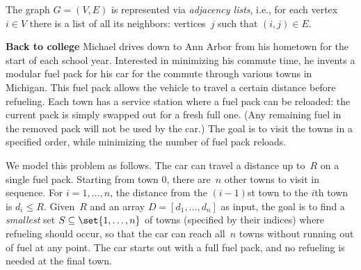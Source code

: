 \documentclass[11pt,addpoints]{exam}
\begin{document}
\begin{questions}
  The graph $G=(V,E)$ is represented via \emph{adjacency lists}, i.e., for each vertex $i \in V$ there is a list of all its neighbors: vertices~$j$ such that $(i,j) \in E$.


  \question \textbf{Back to college} 
  \nopagebreak
   Michael drives down to Ann Arbor from his hometown for the start of each school year.
   Interested in minimizing his commute time, he invents a modular fuel pack for his car for the commute through various towns in Michigan.
   This fuel pack allows the vehicle to travel a certain distance before refueling.
   Each town has a service station where a fuel pack can be reloaded: the current pack is simply swapped out for a fresh full one.
   (Any remaining fuel in the removed pack will not be used by the car.)
   The goal is to visit the towns in a specified order, while minimizing the number of fuel pack reloads.

   We model this problem as follows.
   The car can travel a distance up to~$R$ on a single fuel pack.
   Starting from town 0, there are~$n$ other towns to visit in sequence.
   For $i=1, \ldots, n$, the distance from the $(i-1)$st town to the $i$th town is $d_i \leq R$.
   Given~$R$ and an array $D = [d_1, \ldots, d_n]$ as input, the goal is to find a \emph{smallest} set $S \subseteq \set{1,\ldots,n}$ of towns (specified by their indices) where refueling should occur, so that the car can reach all~$n$ towns without running out of fuel at any point.
   The car starts out with a full fuel pack, and no refueling is needed at the final town.


\end{questions}
\end{document}
